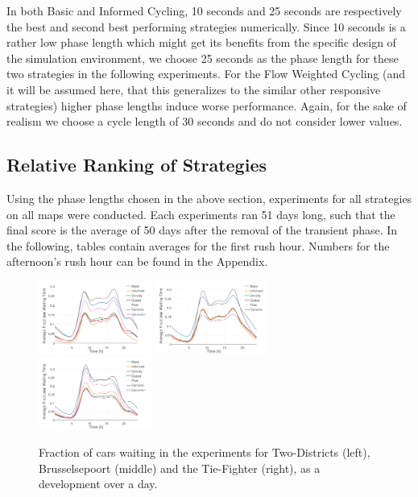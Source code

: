 \documentclass[11pt]{article}
\begin{document}
In both Basic and Informed Cycling, 10 seconds and 25 seconds are respectively the best and second best performing strategies numerically. Since 10 seconds is a rather low phase length which might get its benefits from the specific design of the simulation environment, we choose 25 seconds as the phase length for these two strategies in the following experiments. For the Flow Weighted Cycling (and it will be assumed here, that this generalizes to the similar other responsive strategies) higher phase lengths induce worse performance. Again, for the sake of realism we choose a cycle length of 30 seconds and do not consider lower values.

\subsection{Relative Ranking of Strategies}
Using the phase lengths chosen in the above section, experiments for all strategies on all maps were conducted. Each experiments ran 51 days long, such that the final score is the average of 50 days after the removal of the transient phase. In the following, tables contain averages for the first rush hour. Numbers for the afternoon's rush hour can be found in the Appendix.

\begin{figure}[t]
	\includegraphics[width=0.33\textwidth]{img/frac_time_waiting_twodistr.png}
	\includegraphics[width=0.33\textwidth]{img/frac_time_waiting_maas.png}
	\includegraphics[width=0.33\textwidth]{img/frac_time_waiting_tie.png}
	\caption{Fraction of cars waiting in the experiments for Two-Districts (left), Brusselsepoort (middle) and the Tie-Fighter (right), as a development over a day. \label{fig:frac-waits-line}}
\end{figure}
\end{document}

